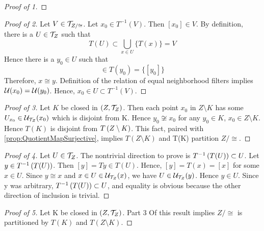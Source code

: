 \begin{prop}
\begin{proof}[Proof of 1]
    \end{proof}
    \begin{proof}[Proof of 2]
        Let $V \in \mathcal{T}_{Z/\cong}$. 
        Let $x_0 \in T^{-1}(V)$. 
        Then $[x_0] \in V$. 
        By definition, there is a $U \in \mathcal{T}_Z$ such that 
        \begin{equation}
            T(U) \subset \bigcup\limits_{x \in U} \{T(x)\}=V
        \end{equation}
        Hence there is a $y_0 \in U$  such that 
        \begin{equation}
            [x_0] \in T(y_0) = \{[y_0]\}
        \end{equation}
        Therefore, $x \cong y$. 
        Definition of the relation of equal neighborhood filters implies $\mathcal{U}(x_0)=\mathcal{U}(y_0)$. 
        Hence, $x_0 \in U \subset T^{-1}(V)$.
    \end{proof}
    \begin{proof}[Proof of 3]
        Let $K$ be closed in $(Z,\mathcal{T}_Z)$. 
        Then each point $x_0$ in $Z\setminus K$ has some $U_{x_0} \in \mathcal{U}_{\mathcal{T}_Z}(x_0)$ which is disjoint from K.
        Hence $y_0 \not \cong x_0$ for any $y_0 \in K$, $x_0 \in Z\setminus K$. 
        Hence $T(K)$ is disjoint from $T\left( Z \setminus K\right)$. 
        This fact, paired with \ref{prop:QuotientMapSurjective}, implies $T(Z\setminus K)$ and T(K) partition $Z/\cong$.
    \end{proof}
    \begin{proof}[Proof of 4]
        Let $U \in \mathcal{T}_Z$. 
        The nontrivial direction to prove is $T^{-1}\left( T(U)\right) \subset U$.
        Let $y \in T^{-1}\left( T(U)\right)$. 
        Then $[y]=Ty \in T(U)$.
        Hence, $[y]=T(x)=[x]$ for some $x \in U$. 
        Since $y \cong x$ and $x \in U \in \mathcal{U}_{\mathcal{T}_Z}(x)$, we have $U \in \mathcal{U}_{\mathcal{T}_Z}(y)$. 
        Hence $y \in U$.
        Since y was arbitrary, $T^{-1}\left( T(U)\right) \subset U$, and equality is obvious because the other direction of inclusion is trivial. 
    \end{proof}
    \begin{proof}[Proof of 5]
        Let K be closed in $(Z,\mathcal{T}_Z)$. Part 3 Of this result implies $Z/\cong$ is partitioned by $T(K)$ and $T(Z\setminus K)$. 
        

\end{proof}
\end{prop}
